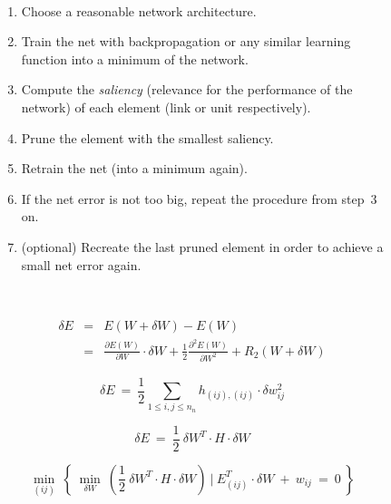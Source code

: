 {\newpage
\clearpage
\samepage \begin{figure}[htbp]
\mbox{\ }\hrulefill\mbox{\ }

\begin{enumerate}
\item Choose a reasonable network architecture.
\item Train the net with backpropagation or any similar learning
function into a minimum of the network.
\item Compute the {\it saliency} (relevance for the performance of the
network) of each element (link or unit respectively).
\item Prune the element with the smallest saliency.
\item Retrain the net (into a minimum again).
\item If the net error is not too big, repeat the procedure from
step~3 on.
\item (optional) Recreate the last pruned element in order to achieve
a small net error again.
\end{enumerate}

\mbox{\ }\hrulefill\mbox{\ }


\label{prsensalg}
\end{figure}
}

{\newpage
\clearpage
\samepage \begin{eqnarray}\delta E & = & E (W + \delta W) - E (W) \nonumber \\ 
 & = & \frac{\partial E(W)}{\partial W} \cdot \delta W +
\frac{1}{2} \frac{\partial^2 E(W)}{\partial W^2} +
R_2 (W + \delta W)
\label{prtaylorobd}
\end{eqnarray}
}

{\newpage
\clearpage
\samepage \begin{equation}\delta E\ =\ \frac{1}{2} \sum_{1 \leq i,j \leq n_n} h_{(ij),(ij)} 
\cdot \delta w_{ij}^2
\end{equation}
}

{\newpage
\clearpage
\samepage \begin{equation}\delta E\ =\ \frac{1}{2}\ \delta W^T \cdot H \cdot \delta W
\label{probstaylorred}
\end{equation}
}

{\newpage
\clearpage
\samepage \begin{equation}\min_{(ij)}\ \left\{\ 
\min_{\delta W}\ 
\left(\frac{1}{2}\ \delta W^T \cdot H \cdot \delta W \right)
\ |\ E_{(ij)}^T \cdot \delta W\ +\ w_{ij}\ =\ 0 
\ \right\}
\end{equation}
}

